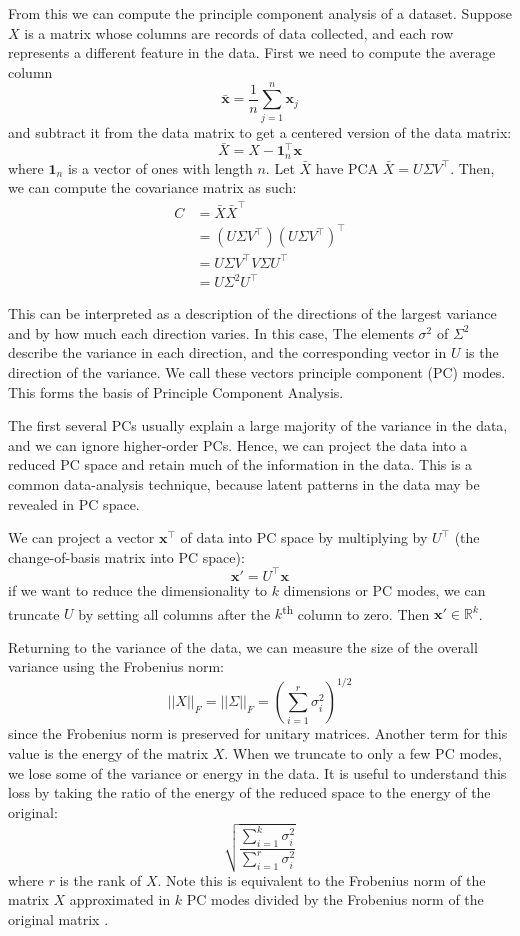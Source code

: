 \documentclass[11pt]{amsart}
\newcommand{\reals}{\mathbb{R}}
\newcommand{\tr}{\top}
\renewcommand{\vec}[1]{\mathbf{#1}}
\newcommand{\todo}[1]{\textcolor{red}{TODO: #1}}
\begin{document}
From this we can compute the principle component analysis of a dataset. Suppose
\(X\) is a matrix whose columns are records of data collected, and each row
represents a different feature in the data. First we need to compute the average
column
\[ \bar{\vec{x}} = \frac{1}{n} \sum_{j=1}^n \vec x_j\]
and subtract it from the data matrix to get a centered version of the data
matrix:
\[ \bar X = X - \vec 1_n^\tr \vec x\]
where \(\vec 1_n\) is a vector of ones with length \(n\).
Let \(\bar X\) have PCA \(\bar X = U \Sigma V^\top\). Then, we can compute the
covariance matrix as such:
\begin{align*}
    C &= \bar X \bar X^\tr \\
      &= (U \Sigma V^\tr) (U \Sigma V^\tr)^\tr \\
      &= U \Sigma V^\tr V \Sigma U^\tr \\
      &= U \Sigma^2 U^\tr
\end{align*}

This can be interpreted as a description of the directions of the largest
variance and by how much each direction varies. In this case, The elements
\(\sigma^2\) of \(\Sigma ^2\) describe the variance in each direction, and the
corresponding vector in \(U\) is the direction of the variance. We call
these vectors principle component (PC) modes. This forms the basis of Principle
Component Analysis.

The first several PCs usually explain a large majority of the variance in the
data, and we can ignore higher-order PCs. Hence, we can project the data into a
reduced PC space and retain much of the information in the data. This is a
common data-analysis technique, because latent patterns in the data may be
revealed in PC space.

We can project a vector \(\vec x^\tr\) of data into PC space by multiplying by
\(U^\tr\) (the change-of-basis matrix into PC space):
\[ \vec x' =  U^\tr \vec x \]
if we want to reduce the dimensionality to \(k\) dimensions or PC modes, we can
truncate \(U\) by setting all columns after the \(k\)\textsuperscript{th} column
to zero. Then \(\vec x' \in \reals^k\).

Returning to the variance of the data, we can measure the size of the overall
variance using the Frobenius norm:
\[ ||X||_F = ||\Sigma||_F = \left(\sum_{i=1}^r \sigma_i^2 \right)^{1/2}\]
since the Frobenius norm is preserved for unitary matrices. Another term for
this value is the energy of the matrix \(X\). When we truncate to only a few PC
modes, we lose some of the variance or energy in the data. It is useful to
understand this loss by taking the ratio of the energy of the reduced space to
the energy of the original:
\[ \sqrt{ \frac{ \sum_{i=1}^k \sigma_i^2 }{ \sum_{i=1}^r \sigma_i^2 } } \]
where \(r\) is the rank of \(X\). Note this is equivalent to the Frobenius norm
of the matrix \(X\) approximated in \(k\) PC modes divided by the Frobenius norm
of the original matrix \cite{elsner-hw2}.
\end{document}
